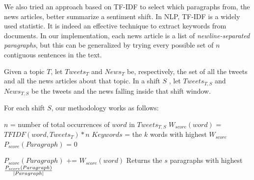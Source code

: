 We also tried an approach based on TF-IDF to select which paragraphs from, the news articles, better summarize a sentiment shift. 
In NLP, TF-IDF is a widely used statistic. It is indeed an effective technique to extract keywords from documents.
In our implementation, each news article is a list of \emph{newline-separated paragraphs}, but this can be generalized by trying every possible set of $n$ contiguous sentences in the text.


Given a topic $T$, let $Tweets_T$ and $News_T$ be, respectively, the set of all the tweets and all the news articles about that topic. 
In a shift $S$ , let $Tweets_{T,S}$ and $News_{T,S}$ be the tweets and the news falling inside that shift window.

For each shift $S$, our methodology works as follows:


\begin{algorithmic}

	\STATE $n$ = number of total occurrences of $word$ in $Tweets_{T,S}$
	\STATE $W_{score}(word)$ = $TFIDF(word,Tweets_T) * n$
\ENDFOR
\STATE
\STATE $Keywords$ = the $k$ words with highest $W_{score}$
\STATE
{}
		\STATE $P_{score}(Paragraph)$ = $0$

				\STATE $P_{score}(Paragraph)$ += $W_{score}(word)$
			\ENDIF
		\ENDFOR
	\ENDFOR
\ENDFOR
\STATE
\STATE Returns the $s$ paragraphs with highest $ {P_{score}(Paragraph) \over |Paragraph| } $


\end{algorithmic}






